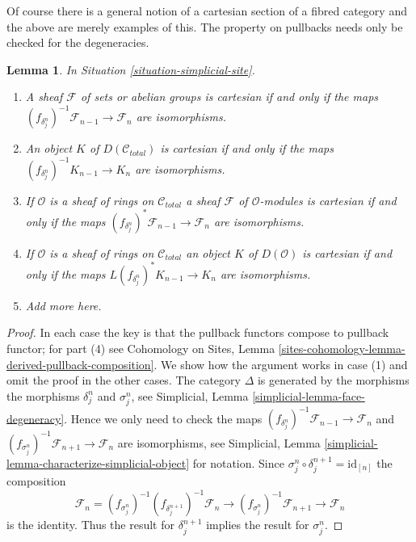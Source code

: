 \documentclass{stacks-project}
\theoremstyle{plain}
\newtheorem{lemma}[subsection]{Lemma}
\theoremstyle{definition}
\theoremstyle{remark}
\numberwithin{equation}{subsection}
\begin{document}
\noindent
Of course there is a general notion of a cartesian section of a
fibred category and the above are merely examples of this.
The property on pullbacks needs only be checked for the degeneracies.

\begin{lemma}
\label{lemma-check-cartesian-module}
In Situation \ref{situation-simplicial-site}.
\begin{enumerate}
\item A sheaf $\mathcal{F}$ of sets or abelian groups is cartesian
if and only if the maps
$(f_{\delta^n_j})^{-1}\mathcal{F}_{n - 1} \to \mathcal{F}_n$
are isomorphisms.
\item An object $K$ of $D(\mathcal{C}_{total})$ is cartesian
if and only if the maps
$(f_{\delta^n_j})^{-1}K_{n - 1} \to K_n$
are isomorphisms.
\item If $\mathcal{O}$ is a sheaf of rings on $\mathcal{C}_{total}$
a sheaf $\mathcal{F}$ of $\mathcal{O}$-modules is cartesian
if and only if the maps
$(f_{\delta^n_j})^*\mathcal{F}_{n - 1} \to \mathcal{F}_n$
are isomorphisms.
\item If $\mathcal{O}$ is a sheaf of rings on $\mathcal{C}_{total}$
an object $K$ of $D(\mathcal{O})$ is cartesian
if and only if the maps
$L(f_{\delta^n_j})^*K_{n - 1} \to K_n$
are isomorphisms.
\item Add more here.
\end{enumerate}
\end{lemma}

\begin{proof}
In each case the key is that the pullback functors
compose to pullback functor; for part (4) see
Cohomology on Sites, Lemma
\ref{sites-cohomology-lemma-derived-pullback-composition}.
We show how the argument works in case (1) and omit the proof
in the other cases.
The category $\Delta$ is generated by the morphisms
the morphisms $\delta^n_j$ and $\sigma^n_j$, see
Simplicial, Lemma \ref{simplicial-lemma-face-degeneracy}.
Hence we only need to check the maps
$(f_{\delta^n_j})^{-1}\mathcal{F}_{n - 1} \to \mathcal{F}_n$
and $(f_{\sigma^n_j})^{-1}\mathcal{F}_{n + 1} \to \mathcal{F}_n$ are
isomorphisms, see
Simplicial, Lemma \ref{simplicial-lemma-characterize-simplicial-object}
for notation. Since $\sigma^n_j \circ \delta_j^{n + 1} = \text{id}_{[n]}$
the composition
$$
\mathcal{F}_n =
(f_{\sigma^n_j})^{-1}
(f_{\delta_j^{n + 1}})^{-1}
\mathcal{F}_n \to
(f_{\sigma^n_j})^{-1}
\mathcal{F}_{n + 1} \to
\mathcal{F}_n
$$
is the identity. Thus the result for $\delta^{n + 1}_j$ implies the result
for $\sigma^n_j$.
\end{proof}
\end{document}
